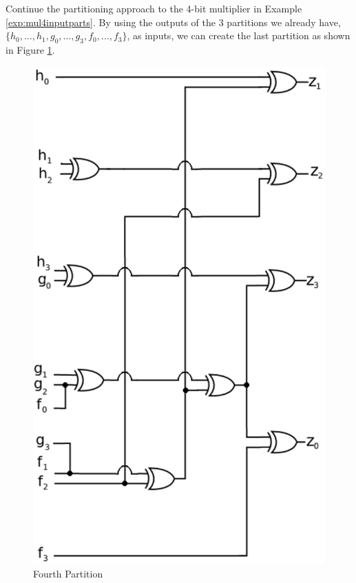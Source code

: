\begin{Example}
Continue the partitioning approach to the 4-bit multiplier
in Example \ref{exp:mul4inputparts}. By using the outputs of the $3$ 
partitions we already have, $\{h_0,\dots,h_1,g_0,\dots,g_3,f_0,\dots,f_3\}$, 
as inputs, we can create the last partition as shown in 
Figure \ref{fig:part4}.

\begin{figure}[H]
	\begin{center}
	\includegraphics[scale=0.7]{figures/part4.eps}
	\end{center}
	\caption{Fourth Partition}
	\label{fig:part4}
\end{figure}


\end{Example}
